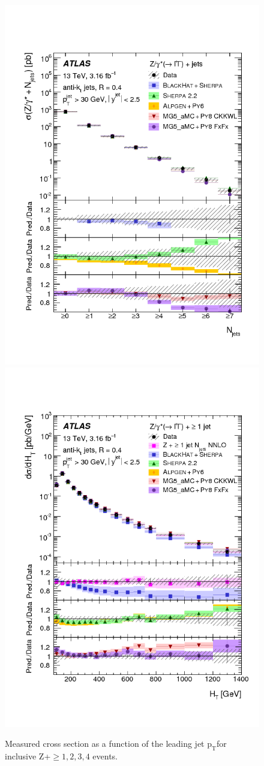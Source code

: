 \documentclass[a4paper,11pt,notoc]{article}
\newcommand{\pt}{\ensuremath{\mathrm{p_T}}}
\begin{document}
\begin{figure}[t!]
\centering
\includegraphics[width=0.495\columnwidth]{figures_results_comb_hJetNTin.png} 
\includegraphics[width=0.495\columnwidth]{figures_results_comb_hHT1jT.png}
\caption{Measured cross section as a function of the leading jet \pt for inclusive Z+$\ge 1,2,3,4$ events.}
\label{ATLASZpt}
\end{figure}   
\end{document}
